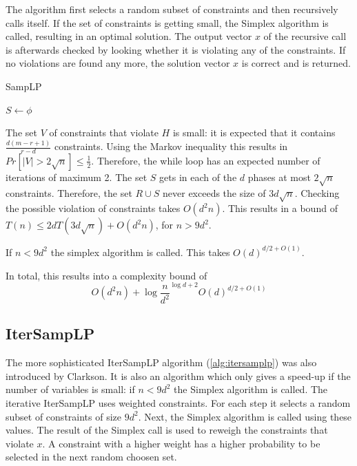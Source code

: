 \documentclass[nocopyrightspace]{acm_proc_article-sp}
\begin{document}
The algorithm first selects a random subset of constraints and then recursively calls itself. If the set of constraints is getting small, the Simplex algorithm is called, resulting in an optimal solution. The output vector $x$ of the recursive call is afterwards checked by looking whether it is violating any of the constraints. If no violations are found any more, the solution vector $x$ is correct and is returned. 

\begin{algorithm}[h]
\label{alg:samplp}
\caption{SampLP}
$S \gets \phi$\;
\end{algorithm}

The set $V$ of constraints that violate $H$ is small: it is expected that it contains  $\frac{d(m-r+1)}{r-d}$ constraints. Using the Markov inequality this results in $Pr[|V|>2\sqrt{n}]\leq \frac{1}{2}$. Therefore, the while loop has an expected number of iterations of maximum 2. The set $S$ gets in each of the $d$ phases at most $2\sqrt{n}$ constraints. Therefore, the set $R \cup S$  never exceeds the size of $3d\sqrt{n}$. Checking the possible violation of constraints takes $O(d^2n)$. This results in a bound of $T(n) \leq 2dT(3d\sqrt{n})+O(d^2n)$, for $n>9d^2$. 

If $n<9d^2$ the simplex algorithm is called. This takes  $O(d)^{d/2+O(1)}$. 

In total, this results into a complexity bound of
\begin{equation}
O(d^2n)+\log{\frac{n}{d^2}}^{\log{d+2}}O(d)^{d/2+O(1)}
\end{equation}

\subsection{IterSampLP}
The more sophisticated IterSampLP algorithm (\ref{alg:itersamplp}) was also introduced by Clarkson\cite{clarkson1995vegas}. It is also an algorithm which only gives a speed-up if the number of variables is small: if $n<9d^2$ the Simplex algorithm is called. The iterative IterSampLP uses weighted constraints. For each step it selects a random subset of constraints of size $9d^2$. Next, the Simplex algorithm is called using these values. The result of the Simplex call is used to reweigh the constraints that violate $x$. A constraint with a higher weight has a higher probability to be selected in the next random choosen set. 
\end{document}
